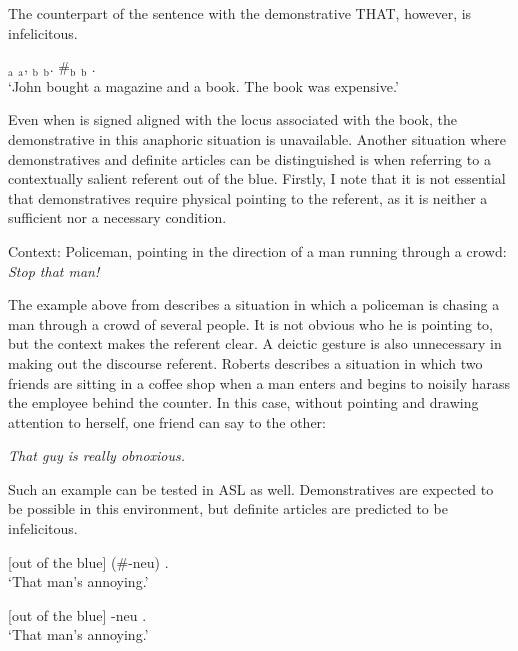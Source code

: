 \documentclass[output=paper,
modfonts
]{langscibook}
\begin{document}
The counterpart of the sentence with the demonstrative THAT, however, is infelicitous. 

\begin{exe}
\ex \label{ex:irani:28}  $_\text{a}$ $_\text{a}$, $_\text{b}$ $_\text{b}$. \#$_\text{b}$ $_\text{b}$ .\\
`John bought a magazine and a book. The book was expensive.'
\end{exe}

Even when  is signed aligned with the locus associated with the book, the demonstrative in this anaphoric situation is unavailable. Another situation where demonstratives and definite articles can be distinguished is when referring to a contextually salient referent out of the blue. Firstly, I note that it is not essential that demonstratives require physical pointing to the referent, as it is neither a sufficient nor a necessary condition.

\begin{exe}
\ex Context: Policeman, pointing in the direction of a man running through a crowd:\\ \textit{Stop that man!} \citep[121]{Roberts2002}
\end{exe}

\noindent The example above from \citet{Roberts2002} describes a situation in which a policeman is chasing a man through a crowd of several people. It is not obvious who he is pointing to, but the context makes the referent clear. A deictic gesture is also unnecessary in making out the discourse referent. Roberts describes a situation in which two friends are sitting in a coffee shop when a man enters and begins to noisily harass the employee behind the counter. In this case, without pointing and drawing attention to herself, one friend can say to the other:

\begin{exe}
\ex \textit{That guy is really obnoxious.} \citep[121]{Roberts2002} 
\end{exe} 

Such an example can be tested in ASL as well. Demonstratives are expected to be possible in this environment, but definite articles are predicted to be infelicitous. 

\begin{exe}
\ex \label{ex:irani:31} [out of the blue] (\#-neu) .\\
`That man's annoying.'

\ex \label{ex:irani:32} [out of the blue] -neu .\\
`That man's annoying.'
\end{exe}
\end{document}
